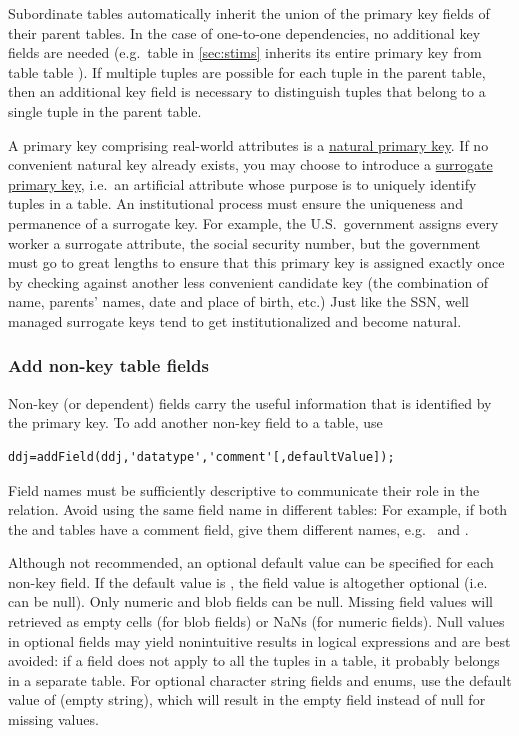 \documentclass[10pt]{article}
\begin{document}
Subordinate tables automatically inherit the union of the primary key fields of their parent tables.  In the case of one-to-one dependencies, no additional key fields are needed (e.g.~table  in \autoref{sec:stims} inherits its entire primary key from table table ). If multiple tuples are possible for each tuple in the parent table, then an additional key field is necessary to distinguish tuples that belong to a single tuple in the parent table.


A primary key comprising real-world attributes is a \href{http://en.wikipedia.org/wiki/Natural_key}{natural primary key}.  If no convenient natural key already exists, you may choose to introduce a \href{http://en.wikipedia.org/wiki/Surrogate_key}{surrogate primary key}, i.e.~an artificial attribute whose purpose is to uniquely identify tuples in a table.  An institutional process must ensure the uniqueness and permanence of a surrogate key. For example, the U.S.~government assigns every worker a surrogate attribute, the social security number, but the government must go to great lengths to ensure that this primary key is assigned exactly once by checking against another less convenient candidate key (the combination of name, parents' names, date and place of birth, etc.)  Just like the SSN, well managed surrogate keys tend to get institutionalized and become natural.  


\subsubsection{Add non-key table fields}
Non-key (or dependent) fields carry the useful information that is identified by the primary key.  To add another non-key field to a table, use 
\begin{lstlisting}
ddj=addField(ddj,'datatype','comment'[,defaultValue]);
\end{lstlisting}
Field names must be sufficiently descriptive to communicate their role in the relation.  Avoid using the same field name in different tables: For example, if both the   and  tables have a comment field, give them different names, e.g.~ and .

Although not recommended, an optional default value can be specified for each non-key field. If the default value is \mcode{[]}, the field value is altogether optional (i.e. can be null).  Only numeric and blob fields can be null. Missing field values will retrieved as empty cells (for blob fields) or NaNs (for numeric fields).  Null values in optional fields may yield nonintuitive results in logical expressions and are best avoided: if a field does not apply to all the tuples in a table, it probably belongs in a separate table. For optional character string fields and enums, use the default value of  (empty string), which will result in the empty field instead of null for missing values.
\end{document}
